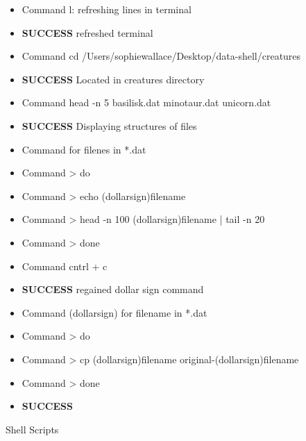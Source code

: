 \documentclass{article}
\begin{document}
\begin{itemize}
\item Command l: refreshing lines in terminal
\item \textbf{SUCCESS} refreshed terminal
\item Command cd /Users/sophiewallace/Desktop/data-shell/creatures
\item \textbf{SUCCESS} Located in creatures directory
\item Command head -n 5 basilisk.dat minotaur.dat unicorn.dat
\item \textbf{SUCCESS} Displaying structures of files
\item Command for filenes in *.dat
\item Command > do
\item Command >  echo (dollarsign)filename
\item Command >  head -n 100 (dollarsign)filename | tail -n 20
\item Command > done
\item Command cntrl + c
\item \textbf{SUCCESS} regained dollar sign command
\item Command (dollarsign) for filename in *.dat
\item Command > do
\item Command >     cp (dollarsign)filename original-(dollarsign)filename
\item Command > done
\item \textbf{SUCCESS} 
\end{itemize}
Shell Scripts
\end{document}
